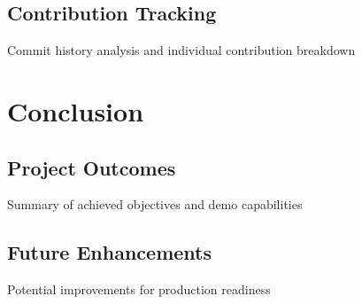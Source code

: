 \documentclass{llncs}
\begin{document}
\subsection{Contribution Tracking}
Commit history analysis and individual contribution breakdown

\section{Conclusion}
\subsection{Project Outcomes}
Summary of achieved objectives and demo capabilities

\subsection{Future Enhancements}
Potential improvements for production readiness

\begin{thebibliography}{9}

\end{thebibliography}
\end{document}
